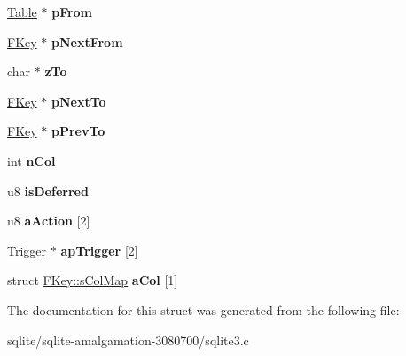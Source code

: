 \begin{DoxyCompactItemize}
\item 
\hypertarget{struct_f_key_a6d476f3fbfa75a19c5c5a9edec4e79eb}{\hyperlink{struct_table}{Table} $\ast$ {\bfseries p\+From}}\label{struct_f_key_a6d476f3fbfa75a19c5c5a9edec4e79eb}

\item 
\hypertarget{struct_f_key_ac64ff66b30167715c8822a74c2809075}{\hyperlink{struct_f_key}{F\+Key} $\ast$ {\bfseries p\+Next\+From}}\label{struct_f_key_ac64ff66b30167715c8822a74c2809075}

\item 
\hypertarget{struct_f_key_a1eac10bab38a0ac9f88306fbbabbe5d6}{char $\ast$ {\bfseries z\+To}}\label{struct_f_key_a1eac10bab38a0ac9f88306fbbabbe5d6}

\item 
\hypertarget{struct_f_key_ac29b26999113602e7e3921bf07643c04}{\hyperlink{struct_f_key}{F\+Key} $\ast$ {\bfseries p\+Next\+To}}\label{struct_f_key_ac29b26999113602e7e3921bf07643c04}

\item 
\hypertarget{struct_f_key_a56189e420e91df86513e6895db518eca}{\hyperlink{struct_f_key}{F\+Key} $\ast$ {\bfseries p\+Prev\+To}}\label{struct_f_key_a56189e420e91df86513e6895db518eca}

\item 
\hypertarget{struct_f_key_a611e3223f3f434e0a635e036dc100cbb}{int {\bfseries n\+Col}}\label{struct_f_key_a611e3223f3f434e0a635e036dc100cbb}

\item 
\hypertarget{struct_f_key_ab742714b17f2c13353837e1fdde51cc7}{u8 {\bfseries is\+Deferred}}\label{struct_f_key_ab742714b17f2c13353837e1fdde51cc7}

\item 
\hypertarget{struct_f_key_a68a08f58294bf845e9c77d785499d222}{u8 {\bfseries a\+Action} \mbox{[}2\mbox{]}}\label{struct_f_key_a68a08f58294bf845e9c77d785499d222}

\item 
\hypertarget{struct_f_key_a9ce15cb27b675836bc714ab18fd8a008}{\hyperlink{struct_trigger}{Trigger} $\ast$ {\bfseries ap\+Trigger} \mbox{[}2\mbox{]}}\label{struct_f_key_a9ce15cb27b675836bc714ab18fd8a008}

\item 
\hypertarget{struct_f_key_a5b230bc6c10a67f432ed7d5ebc92bcd2}{struct \hyperlink{struct_f_key_1_1s_col_map}{F\+Key\+::s\+Col\+Map} {\bfseries a\+Col} \mbox{[}1\mbox{]}}\label{struct_f_key_a5b230bc6c10a67f432ed7d5ebc92bcd2}

\end{DoxyCompactItemize}


The documentation for this struct was generated from the following file\+:\begin{DoxyCompactItemize}
\item 
sqlite/sqlite-\/amalgamation-\/3080700/sqlite3.\+c\end{DoxyCompactItemize}
